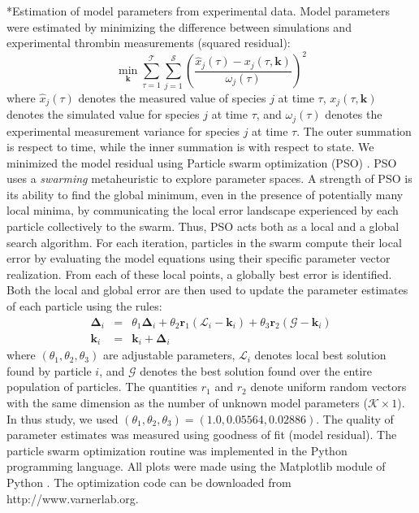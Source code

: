 \documentclass[12pt]{article}
\makeatletter
\renewcommand\subsection{\@startsection
	{subsection}{2}{0mm}
	{-0.05in}
	{-0.5\baselineskip}
	{\normalfont\normalsize\bfseries}}
\makeatother
\begin{document}
\subsection*{Estimation of model parameters from experimental data.}
Model parameters were estimated by minimizing the difference between simulations and experimental thrombin measurements (squared residual):
\begin{equation}\label{eqn:objective-function}
	\min_{\mathbf{k}} \sum_{\tau=1}^{\mathcal{T}}\sum_{j=1}^{\mathcal{S}}\left(\frac{\hat{x}_{j}\left(\tau\right) - x_{j}\left(\tau,\mathbf{k}\right)}{\omega_{j}\left(\tau\right)}\right)^{2}
\end{equation}where $\hat{x}_{j}\left(\tau\right)$ denotes the measured value of species $j$ at time $\tau$, $x_{j}\left(\tau,\mathbf{k}\right)$ denotes the simulated 
value for species $j$ at time $\tau$, and $\omega_{j}\left(\tau\right)$ denotes the experimental measurement variance for species $j$ at time $\tau$. The outer summation is respect to
time, while the inner summation is with respect to state. We minimized the model residual using Particle swarm optimization (PSO) \citep{PSO}.
PSO uses a \textit{swarming} metaheuristic to explore parameter spaces. 
A strength of PSO is its ability to find the global minimum, even in the presence of potentially many local minima, by communicating the local
error landscape experienced by each particle collectively to the swarm. Thus, PSO acts both as a local and a global search algorithm. 
For each iteration, particles in the swarm compute their local error by evaluating the model equations using their specific parameter vector realization.
From each of these local points, a globally best error is identified. Both the local and global error 
are then used to update the parameter estimates of each particle using the rules:
\begin{eqnarray}
	\mathbf{\Delta}_{i} &=&\theta_{1}\mathbf{\Delta}_{i} + \theta_{2}\mathbf{r}_{1}\left(\mathcal{L}_{i} - \mathbf{k}_{i}\right) + \theta_{3}\mathbf{r}_{2}\left(\mathcal{G} - \mathbf{k}_{i}\right) \\
	\mathbf{k}_{i} &=& \mathbf{k}_{i} + \mathbf{\Delta}_{i}
\end{eqnarray}where $\left(\theta_{1},\theta_{2},\theta_{3}\right)$ are adjustable parameters, $\mathcal{L}_{i}$ denotes local best solution found by particle $i$, and
$\mathcal{G}$ denotes the best solution found over the entire population of particles. The quantities $r_{1}$ and $r_{2}$ denote uniform random vectors with the same dimension as the number of unknown model
parameters ($\mathcal{K}\times{1}$). In thus study, we used $\left(\theta_{1},\theta_{2},\theta_{3}\right) = \left(1.0, 0.05564, 0.02886\right)$. The quality of parameter
estimates was measured using goodness of fit (model residual). The particle swarm optimization routine was implemented in the Python programming language. 
All plots were made using the Matplotlib module of Python \citep{Matplotlib}.
The optimization code can be downloaded from http://www.varnerlab.org.
\end{document}
